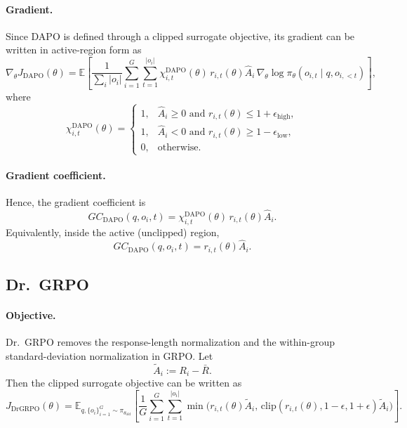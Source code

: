 \documentclass{article}
\begin{document}
\paragraph{Gradient.}
Since DAPO is defined through a clipped surrogate objective, its gradient can be written in
active-region form as
\begin{equation}
\nabla_\theta J_{\mathrm{DAPO}}(\theta)
=
\mathbb{E}
\left[
\frac{1}{\sum_i |o_i|}
\sum_{i=1}^G
\sum_{t=1}^{|o_i|}
\chi^{\mathrm{DAPO}}_{i,t}(\theta)\,
r_{i,t}(\theta)\hat A_i\,
\nabla_\theta \log \pi_\theta(o_{i,t}\mid q,o_{i,<t})
\right],
\label{eq:dapo_gradient}
\end{equation}
where
\begin{equation}
\chi^{\mathrm{DAPO}}_{i,t}(\theta)
=
\begin{cases}
1, & \hat A_i \ge 0 \text{ and } r_{i,t}(\theta)\le 1+\epsilon_{\mathrm{high}},\\
1, & \hat A_i < 0 \text{ and } r_{i,t}(\theta)\ge 1-\epsilon_{\mathrm{low}},\\
0, & \text{otherwise}.
\end{cases}
\label{eq:dapo_indicator}
\end{equation}

\paragraph{Gradient coefficient.}
Hence, the gradient coefficient is
\begin{equation}
GC_{\mathrm{DAPO}}(q,o_i,t)
=
\chi^{\mathrm{DAPO}}_{i,t}(\theta)\,
r_{i,t}(\theta)\hat A_i.
\label{eq:dapo_gc}
\end{equation}
Equivalently, inside the active (unclipped) region,
\begin{equation}
GC_{\mathrm{DAPO}}(q,o_i,t)=r_{i,t}(\theta)\hat A_i.
\label{eq:dapo_gc_active}
\end{equation}

\subsection{Dr.\ GRPO}

\paragraph{Objective.}
Dr.\ GRPO removes the response-length normalization and the within-group standard-deviation
normalization in GRPO. Let
\begin{equation}
\tilde A_i := R_i-\bar R.
\label{eq:drgrpo_advantage}
\end{equation}
Then the clipped surrogate objective can be written as
\begin{equation}
J_{\mathrm{DrGRPO}}(\theta)
=
\mathbb{E}_{q,\{o_i\}_{i=1}^G\sim \pi_{\theta_{\mathrm{old}}}}
\left[
\frac{1}{G}
\sum_{i=1}^G
\sum_{t=1}^{|o_i|}
\min\!\bigl(
r_{i,t}(\theta)\tilde A_i,\,
\mathrm{clip}(r_{i,t}(\theta),1-\epsilon,1+\epsilon)\tilde A_i
\bigr)
\right].
\label{eq:drgrpo_objective}
\end{equation}
\end{document}
